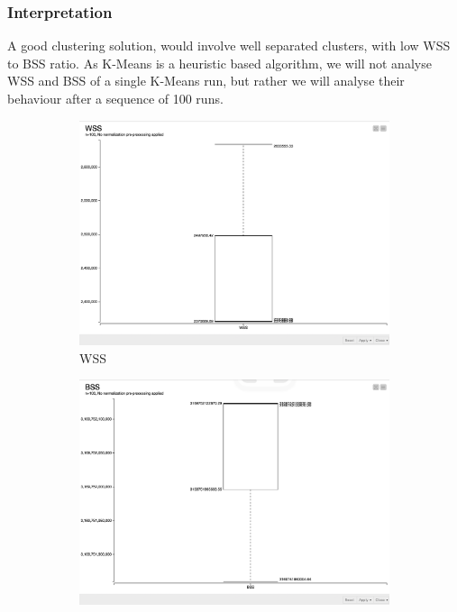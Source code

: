 \subsubsection*{Interpretation}
A good clustering solution, would involve well separated clusters, with low WSS to BSS ratio\cite{???}. As K-Means is a heuristic based algorithm, we will not analyse WSS and BSS of a single K-Means run, but rather we will analyse their behaviour after a sequence of 100 runs. 
\iffalse
\begin{figure}[H]
	
	\centering
	\begin{subfigure}{0.4\textwidth}
		\includegraphics[width=\textwidth]{res/task-1/WSS-Knime}
		\caption{WSS}
		\label{fig:first}
	\end{subfigure}
	\hfill
	\begin{subfigure}{0.4\textwidth}
		\includegraphics[width=\textwidth]{res/task-1/BSS-Knime}

\end{subfigure}
\end{figure}
